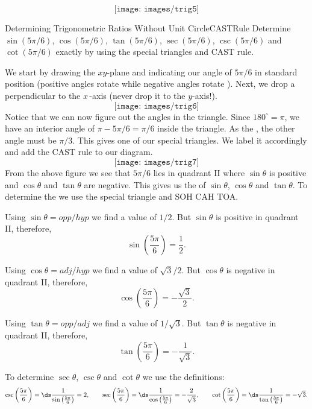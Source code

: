 $$\texttt{[image: images/trig5]}$$

\begin{example}{Determining Trigonometric Ratios Without Unit Circle}{CASTRule}
Determine $\sin (5\pi/6)$, $\cos (5\pi/6)$, $\tan (5\pi/6)$, $\sec (5\pi/6)$, $\csc (5\pi/6)$ and $\cot (5\pi/6)$ exactly by using the special triangles and CAST rule.
\end{example}

\begin{solution} 
We start by drawing the $xy$-plane and indicating our angle of $5\pi/6$ in standard position (positive angles rotate  while negative angles rotate ).
Next, we drop a perpendicular to the $x\,$-axis (never drop it to the $y$-axis!).
$$\texttt{[image: images/trig6]}$$
Notice that we can now figure out the angles in the triangle.
Since $180^\circ=\pi$, we have an interior angle of $\pi-5\pi/6=\pi/6$ inside the triangle. 
As the , the other angle must be $\pi/3$. 
This gives one of our special triangles.
We label it accordingly and add the CAST rule to our diagram.
$$\texttt{[image: images/trig7]}$$
From the above figure we see that $5\pi/6$ lies in quadrant II where $\sin\theta$ is positive and $\cos\theta$ and $\tan\theta$ are negative.
This gives us the  of $\sin\theta$, $\cos\theta$ and $\tan\theta$.
To determine the  we use the special triangle and SOH CAH TOA.

Using $\sin\theta=opp/hyp$ we find a value of $1/2$.
But $\sin\theta$ is positive in quadrant II, therefore, 
$$\sin \left(\frac{5\pi}{6}\right)=\frac{1}{2}.$$

Using $\cos\theta=adj/hyp$ we find a value of $\sqrt 3/2$.
But $\cos\theta$ is negative in quadrant II, therefore, 
$$\cos \left(\frac{5\pi}{6}\right) =-\frac{\sqrt 3}{2}.$$

Using $\tan\theta=opp/adj$ we find a value of $1/\sqrt 3$.
But $\tan\theta$ is negative in quadrant II, therefore, 
$$\tan \left(\frac{5\pi}{6}\right) =-\frac{1}{\sqrt 3}.$$

To determine $\sec\theta$, $\csc\theta$ and $\cot\theta$ we use the definitions:
$$\csc \left(\frac{5\pi}{6}\right)  = \ds\frac{1}{\sin \left(\frac{5\pi}{6}\right)}  = 2,
\qquad \sec \left(\frac{5\pi}{6}\right)  = \ds\frac{1}{\cos \left(\frac{5\pi}{6}\right) } = -\frac{2}{\sqrt 3},
\qquad\cot \left(\frac{5\pi}{6}\right) = \ds\frac{1}{\tan \left(\frac{5\pi}{6}\right)} = -\sqrt 3.$$
\end{solution}

